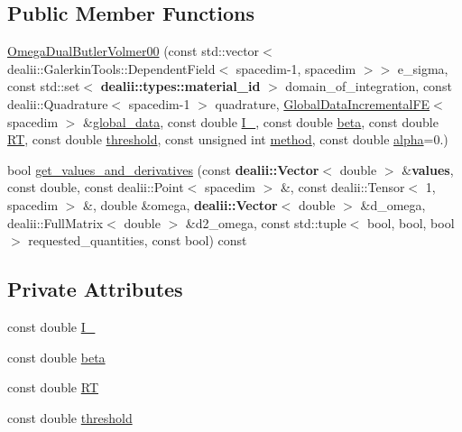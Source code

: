 \subsection*{Public Member Functions}
\begin{DoxyCompactItemize}
\item 
\hyperlink{classincremental_f_e_1_1_omega_dual_butler_volmer00_a4bc64f76770f63e634478f19798d9d27}{Omega\+Dual\+Butler\+Volmer00} (const std\+::vector$<$ dealii\+::\+Galerkin\+Tools\+::\+Dependent\+Field$<$ spacedim-\/1, spacedim $>$$>$ e\+\_\+sigma, const std\+::set$<$ {\bf dealii\+::types\+::material\+\_\+id} $>$ domain\+\_\+of\+\_\+integration, const dealii\+::\+Quadrature$<$ spacedim-\/1 $>$ quadrature, \hyperlink{classincremental_f_e_1_1_global_data_incremental_f_e}{Global\+Data\+Incremental\+FE}$<$ spacedim $>$ \&\hyperlink{classincremental_f_e_1_1_omega_abd23d288a7a4a43f9b528be968cd2113}{global\+\_\+data}, const double \hyperlink{classincremental_f_e_1_1_omega_dual_butler_volmer00_a37608eb032b6e88dd8c9a7d0f553a0bd}{I\+\_}, const double \hyperlink{classincremental_f_e_1_1_omega_dual_butler_volmer00_a8823655ea8aa9eb5668a64c6ee7bf4be}{beta}, const double \hyperlink{classincremental_f_e_1_1_omega_dual_butler_volmer00_a2f32c4f92c11646ed2f6741977d9833f}{RT}, const double \hyperlink{classincremental_f_e_1_1_omega_dual_butler_volmer00_abdc57ace8b842d20ea8f8941b948db41}{threshold}, const unsigned int \hyperlink{classincremental_f_e_1_1_omega_a7600d263ebf98129629e44fa67e8a58c}{method}, const double \hyperlink{classincremental_f_e_1_1_omega_a891688560ec0ad8dc5a0058a7b400269}{alpha}=0.)
\item 
bool \hyperlink{classincremental_f_e_1_1_omega_dual_butler_volmer00_af5cc5ae73af89acdea968203cb29e415}{get\+\_\+values\+\_\+and\+\_\+derivatives} (const {\bf dealii\+::\+Vector}$<$ double $>$ \&{\bf values}, const double, const dealii\+::\+Point$<$ spacedim $>$ \&, const dealii\+::\+Tensor$<$ 1, spacedim $>$ \&, double \&omega, {\bf dealii\+::\+Vector}$<$ double $>$ \&d\+\_\+omega, dealii\+::\+Full\+Matrix$<$ double $>$ \&d2\+\_\+omega, const std\+::tuple$<$ bool, bool, bool $>$ requested\+\_\+quantities, const bool) const 
\end{DoxyCompactItemize}
\subsection*{Private Attributes}
\begin{DoxyCompactItemize}
\item 
const double \hyperlink{classincremental_f_e_1_1_omega_dual_butler_volmer00_a37608eb032b6e88dd8c9a7d0f553a0bd}{I\+\_}
\item 
const double \hyperlink{classincremental_f_e_1_1_omega_dual_butler_volmer00_a8823655ea8aa9eb5668a64c6ee7bf4be}{beta}
\item 
const double \hyperlink{classincremental_f_e_1_1_omega_dual_butler_volmer00_a2f32c4f92c11646ed2f6741977d9833f}{RT}
\item 
const double \hyperlink{classincremental_f_e_1_1_omega_dual_butler_volmer00_abdc57ace8b842d20ea8f8941b948db41}{threshold}
\end{DoxyCompactItemize}
